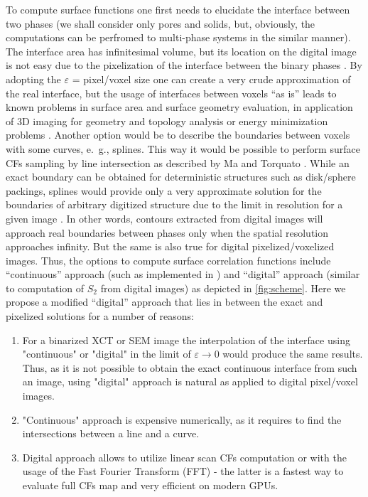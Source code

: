 \documentclass[reprint,amsmath,amssymb,aps,pre,showkeys,showpacs]{revtex4-1}
\begin{document}
To compute surface functions one first needs to elucidate the interface between
two phases (we shall consider only pores and solids, but, obviously, the
computations can be perfromed to multi-phase systems in the similar manner). The
interface area has infinitesimal volume, but its location on the digital image
is not easy due to the pixelization of the interface between the binary phases
\cite{ma2018SS}. By adopting the $\varepsilon$ = pixel/voxel size one can create
a very crude approximation of the real interface, but the usage of interfaces
between voxels ``as is'' leads to known problems in surface area and surface
geometry evaluation, in application of 3D imaging for geometry and topology
analysis \cite{AWR_PNM} or energy minimization problems
\cite{frank2018energy}. Another option would be to describe the boundaries
between voxels with some curves, e.~g., splines. This way it would be possible
to perform surface CFs sampling by line intersection as described by Ma and
Torquato \cite{ma2018SS}. While an exact boundary can be obtained for
deterministic structures such as disk/sphere packings, splines would provide
only a very approximate solution for the boundaries of arbitrary digitized
structure due to the limit in resolution for a given image
\cite{gerke2012tomographic}. In other words, contours extracted from digital
images will approach real boundaries between phases only when the spatial
resolution approaches infinity. But the same is also true for digital
pixelized/voxelized images. Thus, the options to compute surface correlation
functions include ``continuous'' approach (such as implemented in
\cite{ma2018SS}) and ``digital'' approach (similar to computation of $S_2$ from
digital images) as depicted in \cref{fig:scheme}. Here we propose a modified
``digital'' approach that lies in between the exact and pixelized solutions for
a number of reasons:
\begin{enumerate}
  \item For a binarized XCT or SEM image the interpolation of the interface
    using "continuous" or "digital" in the limit of $\varepsilon \to 0$ would
    produce the same results. Thus, as it is not possible to obtain the exact
    continuous interface from such an image, using "digital" approach is natural
    as applied to digital pixel/voxel images.
  \item "Continuous" approach is expensive numerically, as it requires to find the
    intersections between a line and a curve.
  \item Digital approach allows to utilize linear scan CFs computation or with
    the usage of the Fast Fourier Transform (FFT) - the latter is a fastest way
    to evaluate full CFs map and very efficient on modern GPUs.
\end{enumerate}
\end{document}
